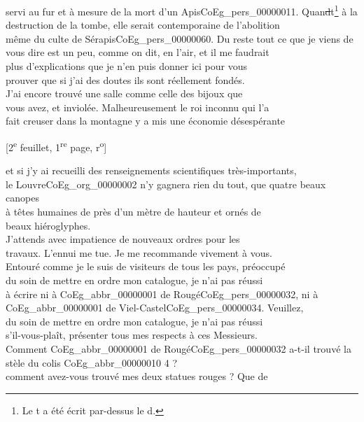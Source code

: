 \documentclass{book}
\begin{document}
servi au fur et à mesure de la mort d’un Apis\gls{CoEg_pers_00000011}. Quan\sout{d}t\footnote{Le t a été écrit par-dessus le d.} à la\\
destruction de la tombe, elle serait contemporaine de l’abolition\\
même du culte de Sérapis\gls{CoEg_pers_00000060}. Du reste tout ce que je viens de\\
vous dire est un peu, comme on dit, en l’air, et il me faudrait\\
plus d’explications que je n’en puis donner ici pour vous\\
prouver que si j’ai des doutes ils sont réellement fondés.\\
\indent J’ai encore trouvé une salle comme celle des bijoux que\\
vous avez, et inviolée. Malheureusement le roi inconnu qui l’a\\
fait creuser dans la montagne y a mis une économie désespérante
{\footnotesize\begin{center} {[2\textsuperscript{e} feuillet, 1\textsuperscript{re} page, r\textsuperscript{o}]}\end{center}}
\noindent et si j’y ai recueilli des renseignements scientifiques très-importants,\\
le Louvre\gls{CoEg_org_00000002} n’y gagnera rien du tout, que quatre beaux canopes\\
à têtes humaines de près d’un mètre de hauteur et ornés de\\
beaux hiéroglyphes.\\
\indent J’attends avec impatience de nouveaux ordres pour les\\
travaux. L’ennui me tue. Je me recommande vivement à vous.\\
Entouré comme je le suis de visiteurs de tous les pays, préoccupé\\
du soin de mettre en ordre mon catalogue, je n’ai pas réussi\\
à écrire ni à \gls{CoEg_abbr_00000001} de Rougé\gls{CoEg_pers_00000032}, ni à \gls{CoEg_abbr_00000001} de Viel-Castel\gls{CoEg_pers_00000034}. Veuillez,\\
du soin de mettre en ordre mon catalogue, je n’ai pas réussi\\
s’il-vous-plaît, présenter tous mes respects à ces Messieurs.\\
Comment \gls{CoEg_abbr_00000001} de Rougé\gls{CoEg_pers_00000032} a-t-il trouvé la stèle du colis \gls{CoEg_abbr_00000010} 4 ?\\
comment avez-vous trouvé mes deux statues rouges ? Que de\\
\end{document}
